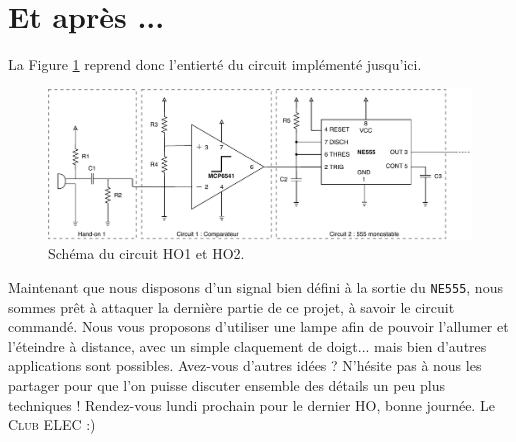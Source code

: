 \section{Et après ...}

La Figure \ref{fig:circuit_HO1_HO2} reprend donc l'entierté du circuit implémenté jusqu'ici.

\begin{figure}[h!]
    \centering
    \includegraphics[width=1\linewidth]{HO1_HO2.pdf}
    \caption{Schéma du circuit HO1 et HO2.}
    \label{fig:circuit_HO1_HO2}
\end{figure}

Maintenant que nous disposons d'un signal bien défini à la sortie du \texttt{NE555}, nous sommes prêt à attaquer la dernière partie de ce projet, à savoir le circuit commandé. Nous vous proposons d'utiliser une lampe afin de pouvoir l'allumer et l'éteindre à distance, avec un simple claquement de doigt... mais bien d'autres applications sont possibles. Avez-vous d'autres idées ? N'hésite pas à nous les partager pour que l'on puisse discuter ensemble des détails un peu plus techniques ! Rendez-vous lundi prochain pour le dernier HO, bonne journée. Le \textsc{Club ELEC} :) 